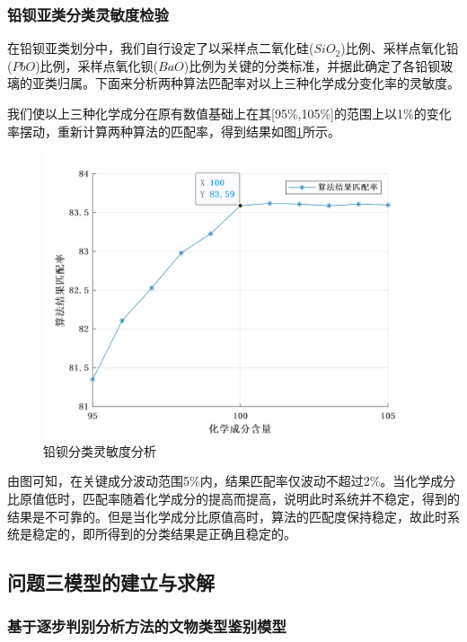 \documentclass{my_paper}
\begin{document}
\subsubsection{铅钡亚类分类灵敏度检验}
在铅钡亚类划分中，我们自行设定了以采样点二氧化硅($SiO_2$)比例、采样点氧化铅($PbO$)比例，采样点氧化钡($BaO$)比例为关键的分类标准，并据此确定了各铅钡玻璃的亚类归属。下面来分析两种算法匹配率对以上三种化学成分变化率的灵敏度。\par
我们使以上三种化学成分在原有数值基础上在其[95\%,105\%]的范围上以1\%的变化率摆动，重新计算两种算法的匹配率，得到结果如图\ref{问题二灵敏度分析}所示。
\begin{figure}[H]
    \centering
    \includegraphics[width=1.0\textwidth]{问题二灵敏度分析.jpg}    \caption{铅钡分类灵敏度分析}
    \label{问题二灵敏度分析}
\end{figure}

由图可知，在关键成分波动范围5\%内，结果匹配率仅波动不超过2\%。当化学成分比原值低时，匹配率随着化学成分的提高而提高，说明此时系统并不稳定，得到的结果是不可靠的。但是当化学成分比原值高时，算法的匹配度保持稳定，故此时系统是稳定的，即所得到的分类结果是正确且稳定的。
\subsection{问题三模型的建立与求解}

\subsubsection{基于逐步判别分析方法的文物类型鉴别模型}
\end{document}
